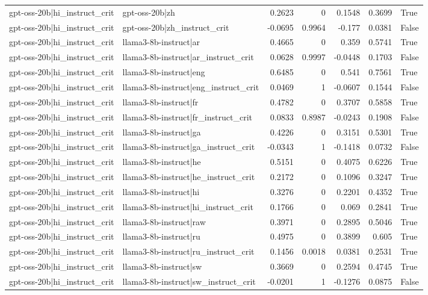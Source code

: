 \begin{table}
\begin{tabular}{l l r r r r l}
gpt-oss-20b|hi_instruct_crit & gpt-oss-20b|zh & 0.2623 & 0 & 0.1548 & 0.3699 & True \\
gpt-oss-20b|hi_instruct_crit & gpt-oss-20b|zh_instruct_crit & -0.0695 & 0.9964 & -0.177 & 0.0381 & False \\
gpt-oss-20b|hi_instruct_crit & llama3-8b-instruct|ar & 0.4665 & 0 & 0.359 & 0.5741 & True \\
gpt-oss-20b|hi_instruct_crit & llama3-8b-instruct|ar_instruct_crit & 0.0628 & 0.9997 & -0.0448 & 0.1703 & False \\
gpt-oss-20b|hi_instruct_crit & llama3-8b-instruct|eng & 0.6485 & 0 & 0.541 & 0.7561 & True \\
gpt-oss-20b|hi_instruct_crit & llama3-8b-instruct|eng_instruct_crit & 0.0469 & 1 & -0.0607 & 0.1544 & False \\
gpt-oss-20b|hi_instruct_crit & llama3-8b-instruct|fr & 0.4782 & 0 & 0.3707 & 0.5858 & True \\
gpt-oss-20b|hi_instruct_crit & llama3-8b-instruct|fr_instruct_crit & 0.0833 & 0.8987 & -0.0243 & 0.1908 & False \\
gpt-oss-20b|hi_instruct_crit & llama3-8b-instruct|ga & 0.4226 & 0 & 0.3151 & 0.5301 & True \\
gpt-oss-20b|hi_instruct_crit & llama3-8b-instruct|ga_instruct_crit & -0.0343 & 1 & -0.1418 & 0.0732 & False \\
gpt-oss-20b|hi_instruct_crit & llama3-8b-instruct|he & 0.5151 & 0 & 0.4075 & 0.6226 & True \\
gpt-oss-20b|hi_instruct_crit & llama3-8b-instruct|he_instruct_crit & 0.2172 & 0 & 0.1096 & 0.3247 & True \\
gpt-oss-20b|hi_instruct_crit & llama3-8b-instruct|hi & 0.3276 & 0 & 0.2201 & 0.4352 & True \\
gpt-oss-20b|hi_instruct_crit & llama3-8b-instruct|hi_instruct_crit & 0.1766 & 0 & 0.069 & 0.2841 & True \\
gpt-oss-20b|hi_instruct_crit & llama3-8b-instruct|raw & 0.3971 & 0 & 0.2895 & 0.5046 & True \\
gpt-oss-20b|hi_instruct_crit & llama3-8b-instruct|ru & 0.4975 & 0 & 0.3899 & 0.605 & True \\
gpt-oss-20b|hi_instruct_crit & llama3-8b-instruct|ru_instruct_crit & 0.1456 & 0.0018 & 0.0381 & 0.2531 & True \\
gpt-oss-20b|hi_instruct_crit & llama3-8b-instruct|sw & 0.3669 & 0 & 0.2594 & 0.4745 & True \\
gpt-oss-20b|hi_instruct_crit & llama3-8b-instruct|sw_instruct_crit & -0.0201 & 1 & -0.1276 & 0.0875 & False \\

\end{tabular}
\end{table}
